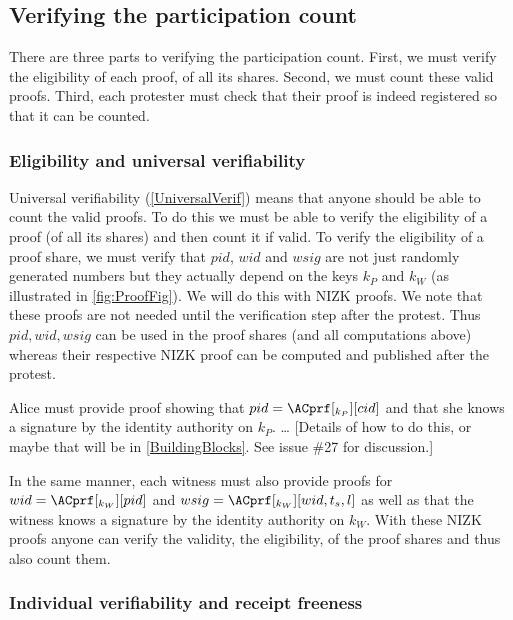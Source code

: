 \subsection{Verifying the participation count}

There are three parts to verifying the participation count.
First, we must verify the eligibility of each proof, \ie of all its shares.
Second, we must count these valid proofs.
Third, each protester must check that their proof is indeed registered so that 
it can be counted.

\subsubsection{Eligibility and universal verifiability}

Universal verifiability (\cref{UniversalVerif}) means that anyone should be able 
to count the valid proofs.
To do this we must be able to verify the eligibility of a proof (\ie of all 
its shares) and then count it if valid.
To verify the eligibility of a proof share, we must verify that \(pid\), \(wid\) 
and \(wsig\) are not just randomly generated numbers but they actually depend on 
the keys \(k_P\) and \(k_W\) (as illustrated in \cref{fig:ProofFig}).
We will do this with \ac{NIZK} proofs.
We note that these proofs are not needed until the verification step after the 
protest.
Thus \(pid, wid, wsig\) can be used in the proof shares (and all computations 
above) whereas their respective \ac{NIZK} proof can be computed and published 
after the protest.

Alice must provide  proof showing that \(pid = \ACprf[_{k_P}][cid]\) 
and that she knows a signature by the identity authority on \(k_P\).
\dots
[Details of how to do this, or maybe that will be in \cref{BuildingBlocks}. See 
issue \#27 for discussion.]

In the same manner, each witness must also provide  proofs for \(wid = 
  \ACprf[_{k_W}][pid]\) and \(wsig = \ACprf[_{k_W}][wid, t_s, l]\) as well as 
that the witness knows a signature by the identity authority on \(k_W\).
With these \ac{NIZK} proofs anyone can verify the validity, \ie the 
eligibility, of the proof shares and thus also count them.

\subsubsection{Individual verifiability and receipt freeness}

